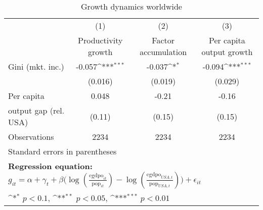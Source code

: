 \begin{table}[htbp]\centering
\def\sym#1{\ifmmode^{#1}\else\(^{#1}\)\fi}
\caption{Growth dynamics worldwide}
\begin{tabular}{l*{3}{c}}
\hline\hline
                &\multicolumn{1}{c}{(1)}&\multicolumn{1}{c}{(2)}&\multicolumn{1}{c}{(3)}\\
                &\multicolumn{1}{c}{Productivity growth}&\multicolumn{1}{c}{Factor accumulation}&\multicolumn{1}{c}{Per capita output growth}\\
\hline
Gini (mkt. inc.)&   -0.057\sym{***}&   -0.037\sym{*}  &   -0.094\sym{***}\\
                &  (0.016)         &  (0.019)         &  (0.029)         \\
[1em]
Per capita      &    0.048         &    -0.21         &    -0.16         \\
output gap (rel. USA)&   (0.11)         &   (0.15)         &   (0.15)         \\
\hline
Observations    &     2234         &     2234         &     2234         \\
\hline\hline
\multicolumn{4}{l}{\footnotesize Standard errors in parentheses}\\
\multicolumn{4}{l}{\footnotesize \textbf{Regression equation:} \(g_{it} = \alpha + \gamma_t + \beta \big(\log (\frac{\textrm{cgdpo}_{it}}{\textrm{pop}_{it}} ) - \log (\frac{\textrm{cgdpo}_{USA,t}}{\textrm{pop}_{USA,t}}  ) \big) + \epsilon_{it}\)}\\
\multicolumn{4}{l}{\footnotesize \sym{*} \(p<0.1\), \sym{**} \(p<0.05\), \sym{***} \(p<0.01\)}\\
\end{tabular}
\end{table}

